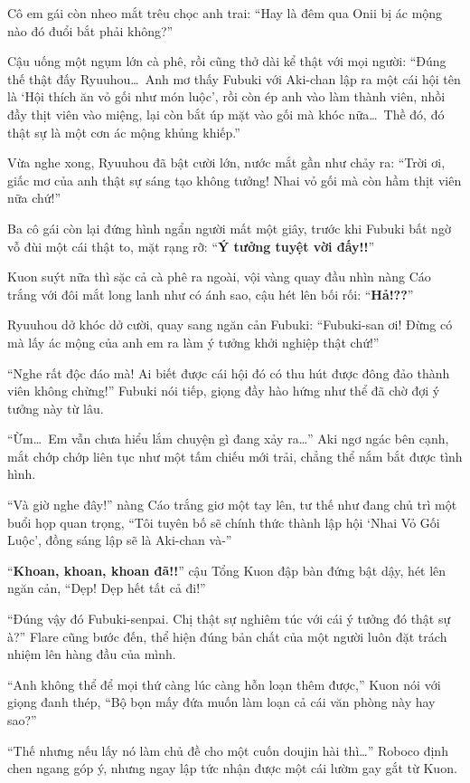 \documentclass[../main.tex]{subfiles}
\begin{document}
Cô em gái còn nheo mắt trêu chọc anh trai: ``Hay là đêm qua Onii bị ác mộng nào đó đuổi bắt phải không?''

Cậu uống một ngụm lớn cà phê, rồi cũng thở dài kể thật với mọi người: ``Đúng thế thật đấy Ryuuhou\dots\ Anh mơ thấy Fubuki với Aki-chan lập ra một cái hội tên là `Hội thích ăn vỏ gối như món luộc', rồi còn ép anh vào làm thành viên, nhồi đầy thịt viên vào miệng, lại còn bắt úp mặt vào gối mà khóc nữa\dots\ Thề đó, đó thật sự là một cơn ác mộng khủng khiếp.''

Vừa nghe xong, Ryuuhou đã bật cười lớn, nước mắt gần như chảy ra: ``Trời ơi, giấc mơ của anh thật sự sáng tạo không tưởng! Nhai vỏ gối mà còn hầm thịt viên nữa chứ!''

Ba cô gái còn lại đứng hình ngẩn người mất một giây, trước khi Fubuki bất ngờ vỗ đùi một cái thật to, mặt rạng rỡ: ``\textbf{Ý tưởng tuyệt vời đấy!!}''

Kuon suýt nữa thì sặc cả cà phê ra ngoài, vội vàng quay đầu nhìn nàng Cáo trắng với đôi mắt long lanh như có ánh sao, cậu hét lên bối rối: ``\textbf{Hả!??}''

Ryuuhou dở khóc dở cười, quay sang ngăn cản Fubuki: ``Fubuki-san ơi! Đừng có mà lấy ác mộng của anh em ra làm ý tưởng khởi nghiệp thật chứ!''

``Nghe rất độc đáo mà! Ai biết được cái hội đó có thu hút được đông đảo thành viên không chừng!'' Fubuki nói tiếp, giọng đầy hào hứng như thể đã chờ đợi ý tưởng này từ lâu.

``Ừm\dots\ Em vẫn chưa hiểu lắm chuyện gì đang xảy ra\dots'' Aki ngơ ngác bên cạnh, mắt chớp chớp liên tục như một tấm chiếu mới trải, chẳng thể nắm bắt được tình hình.

``Và giờ nghe đây!'' nàng Cáo trắng giơ một tay lên, tư thế như đang chủ trì một buổi họp quan trọng, ``Tôi tuyên bố sẽ chính thức thành lập hội `Nhai Vỏ Gối Luộc', đồng sáng lập sẽ là Aki-chan và-''

``\textbf{Khoan, khoan, khoan đã!!}'' cậu Tổng Kuon đập bàn đứng bật dậy, hét lên ngăn cản, ``Dẹp! Dẹp hết tất cả đi!''

``Đúng vậy đó Fubuki-senpai. Chị thật sự nghiêm túc với cái ý tưởng đó thật sự à?'' Flare cũng bước đến, thể hiện đúng bản chất của một người luôn đặt trách nhiệm lên hàng đầu của mình.

``Anh không thể để mọi thứ càng lúc càng hỗn loạn thêm được,'' Kuon nói với giọng đanh thép, ``Bộ bọn mấy đứa muốn làm loạn cả cái văn phòng này hay sao?''

``Thế nhưng nếu lấy nó làm chủ đề cho một cuốn doujin hài thì\dots'' Roboco định chen ngang góp ý, nhưng ngay lập tức nhận được một cái lườm gay gắt từ Kuon.
\end{document}
